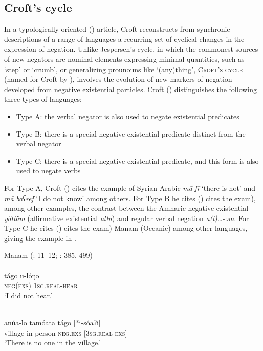\documentclass[output=paper]{langsci/langscibook}
\begin{document}
\subsection{Croft’s cycle}


In a typologically-oriented (\citeyear{Croft1991}) article, Croft reconstructs from synchronic descriptions of a range of languages a recurring set of cyclical changes in the expression of negation. Unlike Jespersen’s cycle, in which the commonest sources of new negators are nominal elements expressing minimal quantities, such as ‘step’ or ‘crumb’, or generalizing prounouns like ‘(any)thing’, \textsc{Croft’s} \textsc{cycle} (named for Croft by \citealt{Kahrel1996}), involves the evolution of new markers of negation developed from negative existential particles. Croft (\citeyear[6]{Croft1991}) distinguishes the following three types of languages:

\begin{itemize}[noitemsep]
	\item[] Type A: the verbal negator is also used to negate existential predicates
	\item[] Type B: there is a special negative existential predicate distinct from the verbal negator
	\item[] Type C: there is a special negative existential predicate, and this form is also used to negate verbs 
\end{itemize}

For Type A, Croft (\citeyear[7]{Croft1991}) cites the example of Syrian Arabic \textit{mā} \textit{fī} ‘there is not’ and \textit{mā} \textit{baʕref} ‘I do not know’ among others. For Type B he cites (\citeyear[9]{Croft1991}) cites the exam), among other examples, the contrast between the Amharic negative existential \textit{yälläm} (affirmative existential \textit{allu}) and regular verbal negation \textit{a(l)…-əm}. For Type C he cites (\citeyear[11--12]{Croft1991}) cites the exam) Manam (Oceanic) among other languages, giving the example in .


\ea\label{ex:key:man}
{Manam (\citealt{Croft1991}: 11–12; \citealt{Lichtenberk1983}: 385, 499)}\\
\\
\gll tágo u-lóŋo\\
     \textsc{neg(exs)} \textsc{1sg.real-}\textsc{\textup{hear}}  \\
\glt ‘I did not hear.’

\\
\gll anúa-lo tamóata tágo [*i-sóaʔi]\\
     village-in person \textsc{neg.exs} \textsc{[3sg.real-exs]}\\
\glt  ‘There is no one in the village.’
\z
\z
\end{document}
